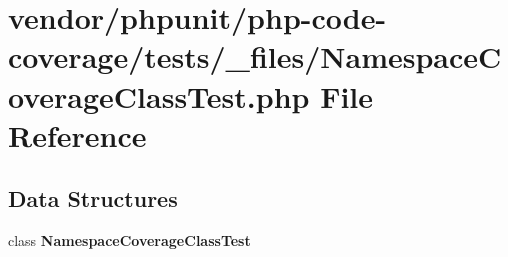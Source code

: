 \section{vendor/phpunit/php-\/code-\/coverage/tests/\+\_\+files/\+Namespace\+Coverage\+Class\+Test.php File Reference}
\label{php-code-coverage_2tests_2__files_2_namespace_coverage_class_test_8php}
\subsection*{Data Structures}
\begin{DoxyCompactItemize}
\item 
class {\bf Namespace\+Coverage\+Class\+Test}
\end{DoxyCompactItemize}
